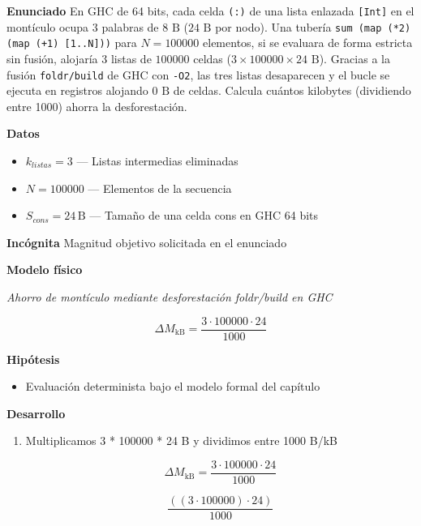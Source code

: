 \documentclass{book}
\begin{document}
\begin{tcolorbox}[title={Problema resuelto}, studiumworked, breakable]

\noindent\textbf{Enunciado}
En GHC de 64 bits, cada celda \texttt{(:)} de una lista enlazada \texttt{[Int]} en el montículo ocupa \(3\) palabras de \(8\text{ B}\) (\(24\text{ B}\) por nodo). Una tubería \texttt{sum (map (*2) (map (+1) [1..N]))} para \(N = 100000\) elementos, si se evaluara de forma estricta sin fusión, alojaría \(3\) listas de \(100000\) celdas (\(3 \times 100000 \times 24\text{ B}\)). Gracias a la fusión \texttt{foldr/build} de GHC con \texttt{-O2}, las tres listas desaparecen y el bucle se ejecuta en registros alojando \(0\text{ B}\) de celdas. Calcula cuántos kilobytes (dividiendo entre 1000) ahorra la desforestación.

\noindent\textbf{Datos}
\begin{itemize}
\item $k_{listas} = 3$ — Listas intermedias eliminadas
\item $N = 100000$ — Elementos de la secuencia
\item $S_{cons} = 24\,\mathrm{B}$ — Tamaño de una celda cons en GHC 64 bits
\end{itemize}

\noindent\textbf{Incógnita}
Magnitud objetivo solicitada en el enunciado

\noindent\textbf{Modelo físico}

\noindent\textit{Ahorro de montículo mediante desforestación foldr/build en GHC}

\[
\Delta M_{\text{kB}} = \frac{3 \cdot 100000 \cdot 24}{1000}
\]

\noindent\textbf{Hipótesis}
\begin{itemize}
\item Evaluación determinista bajo el modelo formal del capítulo
\end{itemize}

\noindent\textbf{Desarrollo}
\begin{enumerate}
\item
Multiplicamos 3 * 100000 * 24 B y dividimos entre 1000 B/kB

\[
\Delta M_{\text{kB}} = \frac{3 \cdot 100000 \cdot 24}{1000}
\]

\[
\frac{\left(\left(3\cdot 100000\right)\cdot 24\right)}{1000}
\]
\end{enumerate}


\end{tcolorbox}
\end{document}
